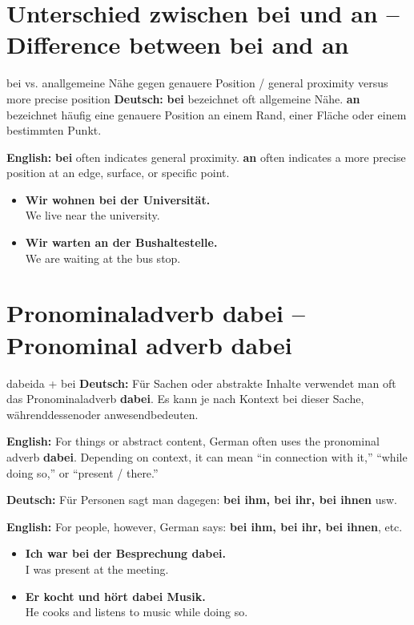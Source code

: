 \documentclass[a4paper,11pt]{article}
\newcommand{\GermanText}[1]{\textbf{Deutsch: }#1\par}
\newcommand{\EnglishText}[1]{{\small\color{SoftGray}\textbf{English: }#1\par}}
\newcommand{\ExampleItem}[2]{\item \textbf{#1}\\{\small\color{SoftGray}#2}}
\begin{document}
   \section{Unterschied zwischen bei und an -- Difference between bei and an}
                                       \begin{grammarentry}{bei vs. an}{allgemeine Nähe gegen genauere Position / general proximity versus more precise position}
                                          \GermanText{\textbf{bei} bezeichnet oft allgemeine Nähe. \textbf{an} bezeichnet häufig eine genauere Position an einem Rand, einer Fläche oder einem bestimmten Punkt.}
                                          \EnglishText{\textbf{bei} often indicates general proximity. \textbf{an} often indicates a more precise position at an edge, surface, or specific point.}
                                       \end{grammarentry}
                                       \begin{exbox}\begin{itemize}
                                          \ExampleItem{Wir wohnen bei der Universität.}{We live near the university.}
                                          \ExampleItem{Wir warten an der Bushaltestelle.}{We are waiting at the bus stop.}
                                          \end{itemize}\end{exbox}

   \section{Pronominaladverb dabei -- Pronominal adverb dabei}
                                          \begin{grammarentry}{dabei}{da + bei}
                                             \GermanText{Für Sachen oder abstrakte Inhalte verwendet man oft das Pronominaladverb \textbf{dabei}. Es kann je nach Kontext \glqq bei dieser Sache\grqq, \glqq währenddessen\grqq oder \glqq anwesend\grqq bedeuten.}
                                             \EnglishText{For things or abstract content, German often uses the pronominal adverb \textbf{dabei}. Depending on context, it can mean ``in connection with it,'' ``while doing so,'' or ``present / there.''}
                                             \GermanText{Für Personen sagt man dagegen: \textbf{bei ihm, bei ihr, bei ihnen} usw.}
                                             \EnglishText{For people, however, German says: \textbf{bei ihm, bei ihr, bei ihnen}, etc.}
                                          \end{grammarentry}
                                          \begin{exbox}\begin{itemize}
                                             \ExampleItem{Ich war bei der Besprechung dabei.}{I was present at the meeting.}
                                             \ExampleItem{Er kocht und hört dabei Musik.}{He cooks and listens to music while doing so.}
                                             \end{itemize}\end{exbox}
\end{document}

